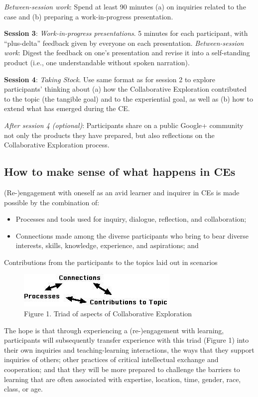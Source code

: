 \emph{Between-session work}: Spend at least 90 minutes (a) on inquiries
related to the case and (b) preparing a work-in-progress presentation.

\textbf{Session 3}: \emph{Work-in-progress presentations}. 5 minutes for
each participant, with ``plus-delta'' feedback given by everyone on each
presentation. \emph{Between-session work}: Digest the feedback on one's
presentation and revise it into a self-standing product (i.e., one
understandable without spoken narration). 

\textbf{Session 4}: \emph{Taking Stock}. Use same format as for session 2 to explore
participants' thinking about (a) how the Collaborative Exploration
contributed to the topic (the tangible goal) and to the experiential
goal, as well as (b) how to extend what has emerged during the CE.

\emph{After session 4 (optional)}: Participants share on a public
Google+ community not only the products they have prepared, but also
reflections on the Collaborative Exploration process.

\subsection{How to make sense of what happens in CEs}

(Re-)engagement with oneself as an avid learner and inquirer in CEs is
made possible by the combination of:

\begin{itemize}
\item
  Processes and tools used for inquiry, dialogue, reflection, and
  collaboration;
\item
  Connections made among the diverse participants who bring to bear
  diverse interests, skills, knowledge, experience, and aspirations; and
\end{itemize}
Contributions from the participants to the topics laid out in scenarios

\begin{figure}[htbp]
\centering
\includegraphics{../pictures/ce.jpg}
\caption*{Figure 1.  Triad of aspects of Collaborative Exploration}
\end{figure}

The hope is that through experiencing a (re-)engagement with learning,
participants will subsequently transfer experience with this triad
(Figure 1) into their own inquiries and teaching-learning
interactions, the ways that they support inquiries of others; other
practices of critical intellectual exchange and cooperation; and that
they will be more prepared to challenge the barriers to learning that
are often associated with expertise, location, time, gender, race,
class, or age.


